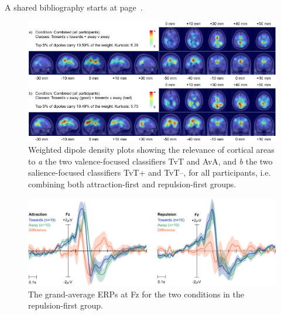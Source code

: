 A shared bibliography starts at page~\pageref{bibliography}.

\vfill

\begin{figure}[!h]
    \centering
    \includegraphics[width=\textwidth]{figures/salval-allparticipants-wdd-combined-sum.pdf}
    \caption[Weighted dipole density plots of the combined salience- and valence-focused classifiers, for all participants combined.]{Weighted dipole density plots showing the relevance of cortical areas to \emph{a} the two valence-focused classifiers TvT and AvA, and \emph{b} the two salience-focused classifiers TvT+ and TvT--, for all participants, i.e. combining both attraction-first and repulsion-first groups.}
    \label{salval:fig:allparticipants-wdd-combined-sum}
\end{figure}

\vfill\null

\clearpage
\begin{figure}[t]
    \centering
    \includegraphics[width=\textwidth]{figures/salval-negfirst-erp-channel.pdf}
    \caption[The grand-average ERPs at Fz for the two conditions in the repulsion-first group.]{The grand-average ERPs at Fz for the two conditions in the repulsion-first group.}
    \label{salval:fig:negfirst-erp-channel}
\end{figure}

